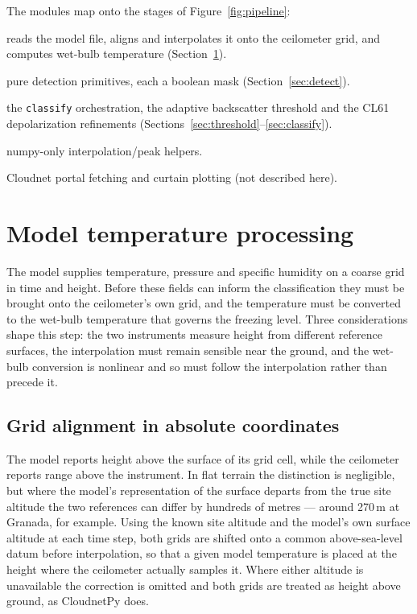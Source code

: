 \documentclass[11pt,a4paper]{article}
\newcommand{\code}[1]{\texttt{#1}}
\begin{document}
The modules map onto the stages of Figure~\ref{fig:pipeline}:
\begin{description}[style=nextline, leftmargin=1.2em, nosep]
  \item[\code{model.py}] reads the model file, aligns and interpolates it onto
        the ceilometer grid, and computes wet-bulb temperature
        (Section~\ref{sec:model}).
  \item[\code{detection.py}] pure detection primitives, each a boolean mask
        (Section~\ref{sec:detect}).
  \item[\code{classification.py}] the \code{classify} orchestration, the adaptive
        backscatter threshold and the CL61 depolarization refinements
        (Sections~\ref{sec:threshold}--\ref{sec:classify}).
  \item[\code{\_interp.py}] numpy-only interpolation/peak helpers.
  \item[\code{download.py}, \code{plot.py}] Cloudnet portal fetching and curtain
        plotting (not described here).
\end{description}

\section{Model temperature processing}
\label{sec:model}

The model supplies temperature, pressure and specific humidity on a coarse grid
in time and height. Before these fields can inform the classification they must be
brought onto the ceilometer's own grid, and the temperature must be converted to
the wet-bulb temperature that governs the freezing level. Three considerations
shape this step: the two instruments measure height from different reference
surfaces, the interpolation must remain sensible near the ground, and the wet-bulb
conversion is nonlinear and so must follow the interpolation rather than precede
it.

\subsection{Grid alignment in absolute coordinates}

The model reports height above the surface of its grid cell, while the ceilometer
reports range above the instrument. In flat terrain the distinction is negligible,
but where the model's representation of the surface departs from the true site
altitude the two references can differ by hundreds of metres --- around 270\,m at
Granada, for example. Using the known site altitude and the model's own surface
altitude at each time step, both grids are shifted onto a common above-sea-level
datum before interpolation, so that a given model temperature is placed at the
height where the ceilometer actually samples it. Where either altitude is
unavailable the correction is omitted and both grids are treated as height above
ground, as CloudnetPy does.
\end{document}
